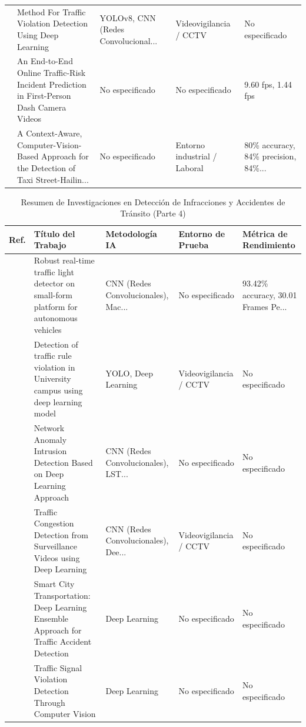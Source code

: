 \begin{table}[htbp]
\begin{tabular}{cp{7.5cm}p{2.8cm}p{2.8cm}p{2.8cm}}
\cite{tangamus2023method} & Method For Traffic Violation Detection Using Deep Learning & YOLOv8, CNN (Redes Convolucional... & Videovigilancia / CCTV & No especificado \\
\cite{pradana2023endtoend} & An End-to-End Online Traffic-Risk Incident Prediction in First-Person Dash Camera Videos & No especificado & No especificado & 9.60 fps, 1.44 fps \\
\cite{mastouri2023contextaware} & A Context-Aware, Computer-Vision-Based Approach for the Detection of Taxi Street-Hailin... & No especificado & Entorno industrial / Laboral & 80\% accuracy, 84\% precision, 84\%... \\
\bottomrule
\end{tabular}
\end{table}


\begin{table}[htbp]
\centering
\renewcommand{\arraystretch}{1.1}
\caption{Resumen de Investigaciones en Detección de Infracciones y Accidentes de Tránsito (Parte 4)}
\label{tab:articulos_transporte_4}
\footnotesize
\begin{tabular}{cp{7.5cm}p{2.8cm}p{2.8cm}p{2.8cm}}
\toprule
\textbf{Ref.} & \textbf{Título del Trabajo} & \textbf{Metodología IA} & \textbf{Entorno de Prueba} & \textbf{Métrica de Rendimiento} \\
\midrule
\cite{golcarenarenji2023robust} & Robust real-time traffic light detector on small-form platform for autonomous vehicles & CNN (Redes Convolucionales), Mac... & No especificado & 93.42\% accuracy, 30.01 Frames Pe... \\
\cite{chaturvedi2023traffic} & Detection of traffic rule violation in University campus using deep learning model & YOLO, Deep Learning & Videovigilancia / CCTV & No especificado \\
\cite{wang2023network} & Network Anomaly Intrusion Detection Based on Deep Learning Approach & CNN (Redes Convolucionales), LST... & No especificado & No especificado \\
\cite{madhavi2023traffic} & Traffic Congestion Detection from Surveillance Videos using Deep Learning & CNN (Redes Convolucionales), Dee... & Videovigilancia / CCTV & No especificado \\
\cite{adewopo2023smart} & Smart City Transportation: Deep Learning Ensemble Approach for Traffic Accident Detection & Deep Learning & No especificado & No especificado \\
\cite{uvais2023traffic} & Traffic Signal Violation Detection Through Computer Vision & Deep Learning & No especificado & No especificado \\

\end{tabular}
\end{table}
